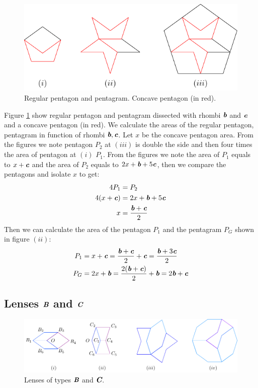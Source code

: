 \documentclass[11pt]{article}
\def\mathbi#1{\textbf{\em #1}}
\begin{document}
\begin{figure}[H]
\centering
\includegraphics[scale=1.1]{bc/penta}
\caption{Regular pentagon and pentagram. Concave pentagon (in red).}
\label{fig:bc-penta}
\end{figure}

Figure \ref{fig:bc-penta} show regular pentagon and pentagram dissected with rhombi $\mathbi{b}$ and $\mathbi{c}$ and a concave pentagon (in red). We calculate the areas of the regular pentagon, pentagram in function of rhombi $\mathbi{b},\mathbi{c}$. Let $x$ be the concave pentagon area. From the figures we note pentagon $P_2$ at $(iii)$ is double the side and then four times the area of pentagon at $(i)$ $P_1$. From the figures we note the area of $P_1$ equals to $x + \mathbi{c}$ and the area of $P_2$ equals to $2x + \mathbi{b} + 5\mathbi{c}$, then we compare the pentagons and isolate $x$ to get:
\begin{align}
4P_1 &= P_2 \nonumber\\
4(x + \mathbi{c}) &= 2x + \mathbi{b} + 5\mathbi{c} \nonumber\\
x &= \frac{\mathbi{b} + \mathbi{c}}2
\end{align}
Then we can calculate the area of the pentagon $P_1$ and the pentagram $P_G$ shown in figure $(ii)$:
\begin{align}
P_1 &= x + \mathbi{c} 
 = \frac{\mathbi{b} + \mathbi{c}}2 + \mathbi{c}
 = \frac{\mathbi{b} + 3\mathbi{c}}2 \\
P_G &= 2x + \mathbi{b}
 = \frac{2(\mathbi{b} + \mathbi{c})}2 + \mathbi{b}
 = 2\mathbi{b} + \mathbi{c}
\end{align}

\subsection{Lenses $\mathbi{B}$ and $\mathbi{C}$}

\begin{figure}[H]
\centering
\includegraphics[scale=1.1]{bc/hexagons}
\caption{Lenses of types $\mathbi{B}$ and $\mathbi{C}$.}
\label{fig:bc-hexagons}
\end{figure}
\end{document}
